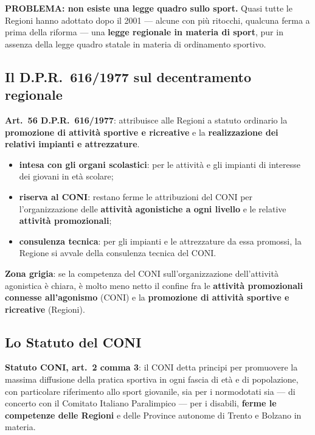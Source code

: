 \textbf{PROBLEMA: non esiste una legge quadro sullo sport.} Quasi tutte le Regioni hanno adottato
dopo il 2001 --- alcune con più ritocchi, qualcuna ferma a prima della riforma --- una
\textbf{legge regionale in materia di sport}, pur in assenza della legge quadro statale in materia
di ordinamento sportivo.

\subsection{Il D.P.R.\ 616/1977 sul decentramento regionale}

\textbf{Art.\ 56 D.P.R.\ 616/1977}: attribuisce alle Regioni a statuto ordinario la
\textbf{promozione di attività sportive e ricreative} e la \textbf{realizzazione dei relativi
impianti e attrezzature}.

\begin{itemize}
  \item \textbf{intesa con gli organi scolastici}: per le attività e gli impianti di interesse dei
    giovani in età scolare;
  \item \textbf{riserva al CONI}: restano ferme le attribuzioni del CONI per l'organizzazione
    delle \textbf{attività agonistiche a ogni livello} e le relative \textbf{attività
    promozionali};
  \item \textbf{consulenza tecnica}: per gli impianti e le attrezzature da essa promossi, la
    Regione si avvale della consulenza tecnica del CONI.
\end{itemize}

\textbf{Zona grigia}: se la competenza del CONI sull'organizzazione dell'attività agonistica è
chiara, è molto meno netto il confine fra le \textbf{attività promozionali connesse all'agonismo}
(CONI) e la \textbf{promozione di attività sportive e ricreative} (Regioni).

\subsection{Lo Statuto del CONI}

\textbf{Statuto CONI, art.\ 2 comma 3}: il CONI detta principi per promuovere la massima diffusione
della pratica sportiva in ogni fascia di età e di popolazione, con particolare riferimento allo
sport giovanile, sia per i normodotati sia --- di concerto con il Comitato Italiano Paralimpico
--- per i disabili, \textbf{ferme le competenze delle Regioni} e delle Province autonome di Trento
e Bolzano in materia.

